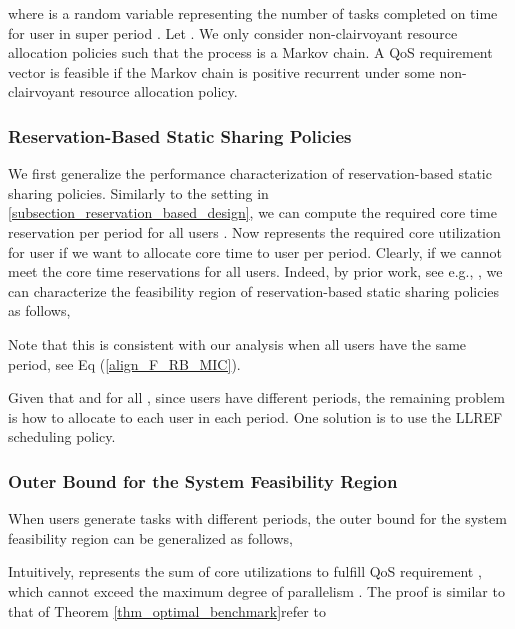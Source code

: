 \documentclass[prodmode,acmtompecs]{acmsmall}
\newcommand{\myComments}[1]{}
\newif\iftompecsonly
\newif\iftompecsextended
\newcommand{\tompecsonlyStart}{\iftompecsonly \myComments{TOMPECS only version: }}
\newcommand{\tompecsextendedStart}{\iftompecsextended  \myComments{TOMPECS extended version: }}
\newcommand{\commentEnd}{\myComments{End}}
\newcommand{\add}[1]{#1}
\begin{document}
where  is a random variable representing the number of tasks completed on time for user  in super period . Let . We only consider non-clairvoyant resource allocation policies such that the process  is a Markov chain. A QoS requirement vector  is feasible if the Markov chain  is positive recurrent under some non-clairvoyant resource allocation policy. 

\subsubsection{Reservation-Based Static Sharing Policies}

We first generalize the performance characterization of reservation-based static sharing policies. Similarly to the setting in {\ref{subsection_reservation_based_design}}, we can compute the required core time reservation per period  for all users . Now  represents the required core utilization for user  if we want to allocate  core time to user  per period. Clearly, if  we cannot meet the core time reservations  for all users. Indeed, by prior work, see e.g., \cite{CRJ06,DaB11}, we can characterize the feasibility region  of reservation-based static sharing policies as follows, 

Note that this is consistent with our analysis when all users have the same period, see Eq (\ref{align_F_RB_MIC}). 

Given that  and  for all , since users have different periods, the remaining problem is how to allocate  to each user  in each period. 
One solution is to use the LLREF scheduling policy. 
\tompecsonlyStart
\add{We omit the details to save space. Refer to the extended version of this paper \cite{EXT} for detailed discussion. }
\commentEnd\fi
\tompecsextendedStart
Refer to Appendix \ref{appendix_LLREF_for_RB} for more details. 
\commentEnd\fi

\subsubsection{Outer Bound  for the System Feasibility Region}

When users generate tasks with different periods, the outer bound  for the system feasibility region can be generalized as follows, 


Intuitively,  represents the sum of core utilizations to fulfill QoS requirement , which cannot exceed the maximum degree of parallelism . The proof is similar to that of Theorem \ref{thm_optimal_benchmark}\textemdash refer to 
\tompecsonlyStart
the extended version of this paper \cite{EXT} for details. 
\commentEnd\fi
\tompecsextendedStart
Appendix \ref{appendix_pf_R_OB_diff_periods} for details. 
\commentEnd\fi
\end{document}
